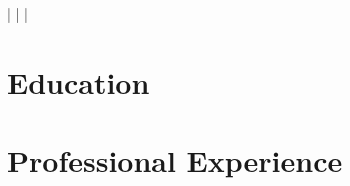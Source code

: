 \documentclass[a4paper,11pt]{article}
\begin{document}
\begin{center}
    \myName
    \myAddress
    \myWebsite | \myMailAddress | \myGithub | \myPhoneNumber 
\end{center}

\section{Education}
    \begin{itemize}
        \phd
            \cvItemizeBegin
                \phdA
                \phdB
            \cvItemizeEnd
        \msc
            \cvItemizeBegin
                \mscA
                \mscB
                \mscC
            \cvItemizeEnd
        \erasmus
            \cvItemizeBegin
                \erasmusA
            \cvItemizeEnd
        \bsc
            \cvItemizeBegin
                \bscA
            \cvItemizeEnd
    \end{itemize}

\section{Professional Experience}
    \begin{itemize}
        \professor
            \cvItemizeBegin
                \professorA
                \professorB
            \cvItemizeEnd
        \postdoc
            \cvItemizeBegin
                \postdocA
                \postdocB
                \postdocNengo
            \cvItemizeEnd
        \expFlowers
            \cvItemizeBegin
                \expFlowersA
                \expFlowersB
            \cvItemizeEnd
        \expTum
            \cvItemizeBegin
                \expTumA
                \expTumB
            \cvItemizeEnd
        \expInfineon
            \cvItemizeBegin
                \expInfineonA
                \expInfineonB
            \cvItemizeEnd
        \newpage
        \expSlive
            \cvItemizeBegin
                \expSliveA
                \expSliveB
            \cvItemizeEnd
        \expEgnition
            \expEgnitionDriverless
            \expEgnitionBusinessPlan    
            \expEgnitionTeamLeader
            \expEgnitionAerodynamics
    \end{itemize}
\end{document}
